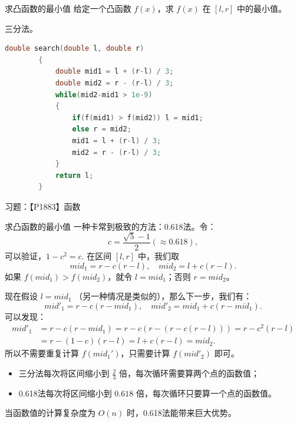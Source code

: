 \documentclass{beamer}
\begin{document}
\begin{frame}[fragile]{求凸函数的最小值}
    \small
    给定一个凸函数 $f(x)$，求 $f(x)$ 在 $[l,r]$ 中的最小值。
    \vspace{2em}

    \pause
    三分法。
    \begin{lstlisting}[language=c++]
        double search(double l, double r)
        {
            double mid1 = l + (r-l) / 3;
            double mid2 = r - (r-l) / 3;
            while(mid2-mid1 > 1e-9)
            {
                if(f(mid1) > f(mid2)) l = mid1;
                else r = mid2;
                mid1 = l + (r-l) / 3;
                mid2 = r - (r-l) / 3;
            }
            return l;
        }
    \end{lstlisting}
    \vspace{2em}

    \pause
    习题：【P1883】函数
\end{frame}

\begin{frame}[fragile]{求凸函数的最小值}
    \footnotesize
    一种卡常到极致的方法：0.618法。令：
    \begin{equation*}
        c=\frac{\sqrt{5}-1}{2}(\approx 0.618),
    \end{equation*}
    可以验证，$1-c^2=c$. 在区间 $[l,r]$ 中，我们取
    \begin{equation*}
        mid_1=r-c(r-l),\quad mid_2=l+c(r-l).
    \end{equation*}
    如果 $f(mid_1)>f(mid_2)$，就令 $l=mid_1$；否则 $r=mid_2$。

    \pause
    现在假设 $l=mid_1$ （另一种情况是类似的），那么下一步，我们有：
    \begin{equation*}
        mid'_1=r-c(r-mid_1),\quad mid'_2=mid_1+c(r-mid_1).
    \end{equation*}
    \pause 可以发现：
    \begin{align*}
        mid'_1&=r-c(r-mid_1)=r-c(r-(r-c(r-l)))=r-c^2(r-l)\\
        &=r-(1-c)(r-l)=l+c(r-l)=mid_2.
    \end{align*}
    所以不需要重复计算 $f(mid_1')$，只需要计算 $f(mid'_2)$ 即可。

    \pause
    \begin{itemize}
        \item 三分法每次将区间缩小到 $\frac{2}{3}$ 倍，每次循环需要算两个点的函数值；
        \item 0.618法每次将区间缩小到 $0.618$ 倍，每次循环只要算一个点的函数值。
    \end{itemize}
    当函数值的计算复杂度为 $O(n)$ 时，0.618法能带来巨大优势。
\end{frame}
\end{document}
